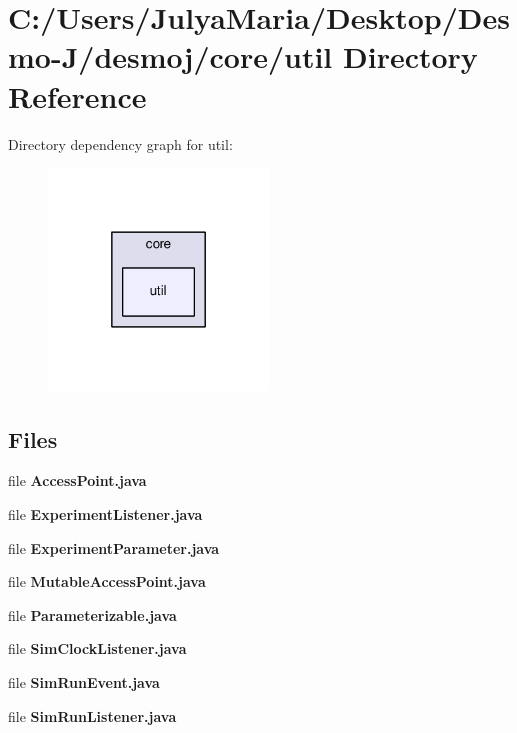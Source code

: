 \section{C\-:/\-Users/\-Julya\-Maria/\-Desktop/\-Desmo-\/\-J/desmoj/core/util Directory Reference}
\label{dir_e0a68be9b4e4fe4de5cbc97d0bf2daf5}
Directory dependency graph for util\-:
\nopagebreak
\begin{figure}[H]
\begin{center}
\leavevmode
\includegraphics[width=166pt]{dir_e0a68be9b4e4fe4de5cbc97d0bf2daf5_dep}
\end{center}
\end{figure}
\subsection*{Files}
\begin{DoxyCompactItemize}
\item 
file {\bfseries Access\-Point.\-java}
\item 
file {\bfseries Experiment\-Listener.\-java}
\item 
file {\bfseries Experiment\-Parameter.\-java}
\item 
file {\bfseries Mutable\-Access\-Point.\-java}
\item 
file {\bfseries Parameterizable.\-java}
\item 
file {\bfseries Sim\-Clock\-Listener.\-java}
\item 
file {\bfseries Sim\-Run\-Event.\-java}
\item 
file {\bfseries Sim\-Run\-Listener.\-java}
\end{DoxyCompactItemize}
